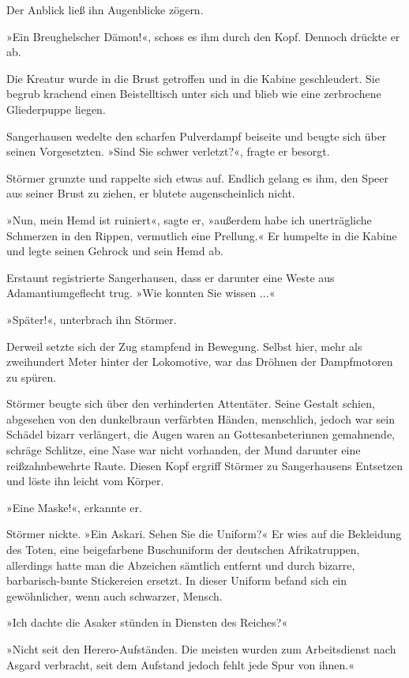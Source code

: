 Der Anblick ließ ihn Augenblicke zögern.

»Ein Breughelscher Dämon!«, schoss es ihm durch den Kopf. Dennoch
drückte er ab.

Die Kreatur wurde in die Brust getroffen und in die Kabine
geschleudert. Sie begrub krachend einen Beistelltisch unter sich
und blieb wie eine zerbrochene Gliederpuppe liegen.

Sangerhausen wedelte den scharfen Pulverdampf beiseite und beugte
sich über seinen Vorgesetzten. »Sind Sie schwer verletzt?«, fragte
er besorgt.

Störmer grunzte und rappelte sich etwas auf. Endlich gelang es ihm,
den Speer aus seiner Brust zu ziehen, er blutete augenscheinlich
nicht.

»Nun, mein Hemd ist ruiniert«, sagte er, »außerdem habe ich
unerträgliche Schmerzen in den Rippen, vermutlich eine Prellung.«
Er humpelte in die Kabine und legte seinen Gehrock und sein Hemd
ab.

Erstaunt registrierte Sangerhausen, dass er darunter eine Weste aus
Adamantiumgeflecht trug. »Wie konnten Sie wissen ...«

»Später!«, unterbrach ihn Störmer.

Derweil setzte sich der Zug stampfend in Bewegung. Selbst hier,
mehr als zweihundert Meter hinter der Lokomotive, war das Dröhnen
der Dampfmotoren zu spüren.

Störmer beugte sich über den verhinderten Attentäter. Seine Gestalt
schien, abgesehen von den dunkelbraun verfärbten Händen,
menschlich, jedoch war sein Schädel bizarr verlängert, die Augen
waren an Gottesanbeterinnen gemahnende, schräge Schlitze, eine Nase
war nicht vorhanden, der Mund darunter eine reißzahnbewehrte Raute.
Diesen Kopf ergriff Störmer zu Sangerhausens Entsetzen und löste
ihn leicht vom Körper.

»Eine Maske!«, erkannte er.

Störmer nickte. »Ein Askari. Sehen Sie die Uniform?« Er wies auf
die Bekleidung des Toten, eine beigefarbene Buschuniform der
deutschen Afrikatruppen, allerdings hatte man die Abzeichen
sämtlich entfernt und durch bizarre, barbarisch-bunte Stickereien
ersetzt. In dieser Uniform befand sich ein gewöhnlicher, wenn auch
schwarzer, Mensch.

»Ich dachte die Asaker stünden in Diensten des Reiches?«

»Nicht seit den Herero-Aufständen. Die meisten wurden zum
Arbeitsdienst nach Asgard verbracht, seit dem Aufstand jedoch fehlt
jede Spur von ihnen.«

